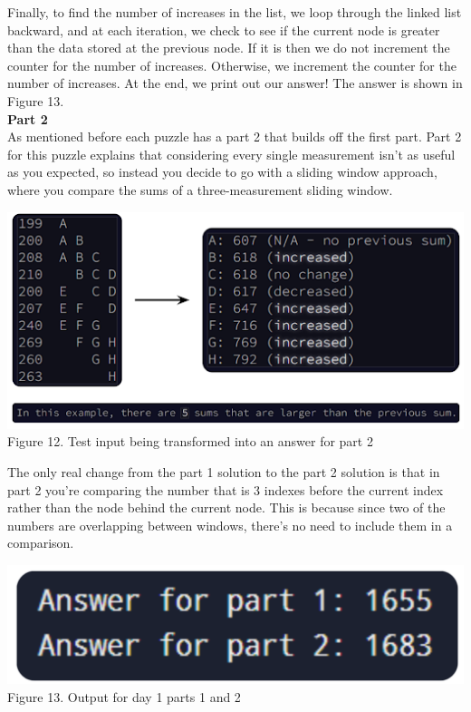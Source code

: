 \documentclass[twoside]{article}
\begin{document}
\noindent Finally, to find the number of increases in the list, we loop through the linked list backward, and at each iteration, we check to see if the current node is greater than the data stored at the previous node. If it is then we do not increment the counter for the number of increases. Otherwise, we increment the counter for the number of increases. At the end, we print out our answer! The answer is shown in Figure 13.\\

\noindent \textbf{\large Part 2} \\
\noindent As mentioned before each puzzle has a part 2 that builds off the first part. Part 2 for this puzzle explains that considering every single measurement isn't as useful as you expected, so instead you decide to go with a sliding window approach, where you compare the sums of a three-measurement sliding window.
\begin{center}
    \includegraphics[width=.75\textwidth]{images/day01TestInputPart2.png}\\
    Figure 12.  Test input being transformed into an answer for part 2
\end{center}

\noindent The only real change from the part 1 solution to the part 2 solution is that in part 2 you’re comparing the number that is 3 indexes before the current index rather than the node behind the current node. This is because since two of the numbers are overlapping between windows, there’s no need to include them in a comparison.
\begin{center}
    \includegraphics[width=.4\textwidth]{images/day01Output.png}\\
    Figure 13. Output for day 1 parts 1 and 2
\end{center}
\end{document}
